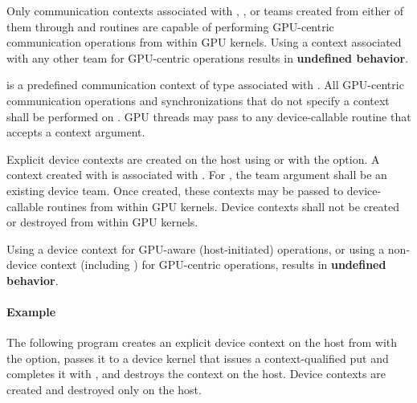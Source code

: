 
Only communication contexts associated with ,
, or teams created from either of them through
 and  routines are
capable of performing GPU-centric communication operations from within \ac{GPU}
kernels. Using a context associated with any other team for GPU-centric
operations results in \textbf{undefined behavior}.

 is a predefined communication context of
type  associated with .
All GPU-centric communication operations and synchronizations that do not specify
a context shall be performed on . \ac{GPU}
threads may pass  to any device-callable
routine that accepts a context argument.

Explicit device contexts are created on the host using 
or  with the  option. A
context created with  is associated with
. For , the team
argument shall be an existing device team. Once created, these contexts may be
passed to device-callable routines from within \ac{GPU} kernels. Device contexts
shall not be created or destroyed from within \ac{GPU} kernels.

Using a device context for GPU-aware (host-initiated) operations, or using a
non-device context (including ) for GPU-centric
operations, results in \textbf{undefined behavior}.

\paragraph*{\textbf{Example}}\mbox{}\par\nobreak
The following program creates an explicit device context on the host from
 with the  option,
passes it to a device kernel that issues a context-qualified put and completes it
with , and destroys the context on the host. Device
contexts are created and destroyed only on the host.



